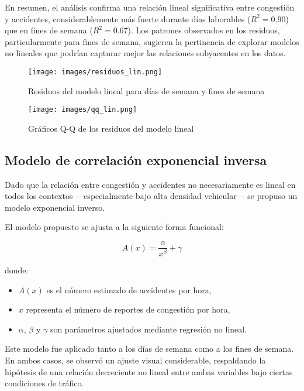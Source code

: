 \documentclass[12pt]{article}
\begin{document}
En resumen, el análisis confirma una relación lineal significativa entre congestión y accidentes, considerablemente más fuerte durante días laborables ($R^2 = 0.90$) que en fines de semana ($R^2 = 0.67$). Los patrones observados en los residuos, particularmente para fines de semana, sugieren la pertinencia de explorar modelos no lineales que podrían capturar mejor las relaciones subyacentes en los datos.


\begin{figure}[H]
\centering
\texttt{[image: images/residuos\_lin.png]}
\caption{Residuos del modelo lineal para días de semana y fines de semana}
\label{fig:resid_lin}
\end{figure}

\begin{figure}[H]
\centering
\texttt{[image: images/qq\_lin.png]}
\caption{Gráficos Q-Q de los residuos del modelo lineal}
\label{fig:qq_lin}
\end{figure}


\subsection{Modelo de correlación exponencial inversa}

Dado que la relación entre congestión y accidentes no necesariamente es lineal en todos los contextos —especialmente bajo alta densidad vehicular— se propuso un modelo exponencial inverso.

El modelo propuesto se ajusta a la siguiente forma funcional:

\begin{equation}
A(x) = \frac{\alpha}{x^{\beta}} + \gamma
\end{equation}

donde:
\begin{itemize}
    \item $A(x)$ es el número estimado de accidentes por hora,
    \item $x$ representa el número de reportes de congestión por hora,
    \item $\alpha$, $\beta$ y $\gamma$ son parámetros ajustados mediante regresión no lineal.
\end{itemize}

Este modelo fue aplicado tanto a los días de semana como a los fines de semana. En ambos casos, se observó un ajuste visual considerable, respaldando la hipótesis de una relación decreciente no lineal entre ambas variables bajo ciertas condiciones de tráfico.
\end{document}
